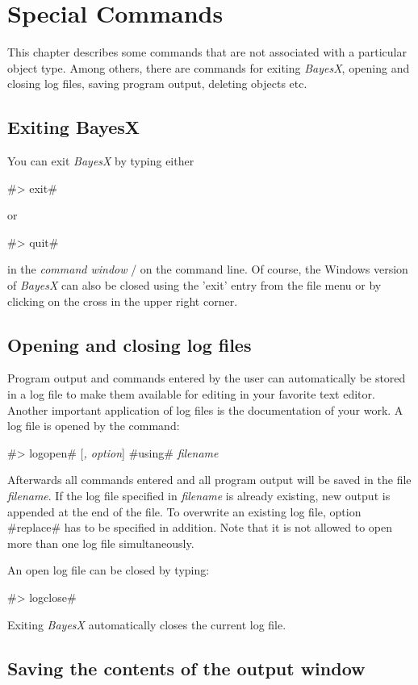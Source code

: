 \chapter{Special Commands}

This chapter describes some commands that are not associated with a particular object type. Among others, there are commands
for exiting {\em BayesX}, opening and closing log files, saving program output, deleting objects etc.

\section{Exiting BayesX}

You can exit {\em BayesX} by typing either

#> exit#

or

#> quit#

in the {\em command window} / on the command line. Of course, the Windows version of {\em BayesX} can also be closed using the
'exit' entry from the file menu or by clicking on the cross in the upper right corner.

\section{Opening and closing log files} \label{logfile}

Program output and commands entered by the user can automatically be stored in a log file to make them available for editing in
your favorite text editor. Another important application of log files is the documentation of your work. A log file is opened
by the command:

#> logopen# [{\em, option}] #using# {\em filename}

Afterwards all commands entered and all program output will be saved in the file {\em filename}. If the log file specified in
{\em filename} is already existing, new output is appended at the end of the file. To overwrite an existing log file, option
#replace# has to be specified in addition. Note that it is not allowed to open more than one log file simultaneously.

An open log file can be closed by typing:

#> logclose#

Exiting {\em BayesX} automatically closes the current log file.

\section{Saving the contents of the output window}
 

